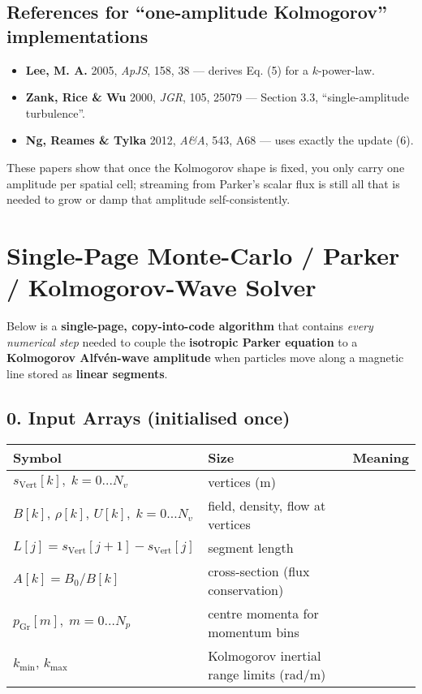 \subsection*{References for “one-amplitude Kolmogorov” implementations}

\begin{itemize}
\item \textbf{Lee, M. A.} 2005, \emph{ApJS}, 158, 38 — derives Eq. (5) for a $k$-power-law.
\item \textbf{Zank, Rice \& Wu} 2000, \emph{JGR}, 105, 25079 — Section 3.3, “single-amplitude turbulence”.
\item \textbf{Ng, Reames \& Tylka} 2012, \emph{A\&A}, 543, A68 — uses exactly the update (6).
\end{itemize}

These papers show that once the Kolmogorov shape is fixed, you only carry one amplitude per spatial cell; streaming from Parker’s scalar flux is still all that is needed to grow or damp that amplitude self-consistently.

\section*{Single-Page Monte-Carlo / Parker / Kolmogorov-Wave Solver}

Below is a \textbf{single-page, copy-into-code algorithm} that contains \emph{every numerical step} needed to couple the \textbf{isotropic Parker equation} to a \textbf{Kolmogorov Alfvén-wave amplitude} when particles move along a magnetic line stored as \textbf{linear segments}.

\subsection*{0. Input Arrays (initialised once)}

\begin{tabular}{|l|l|l|}
\hline
\textbf{Symbol} & \textbf{Size} & \textbf{Meaning} \\
\hline
$s_{\text{Vert}}[k],\; k=0\ldots N_v$ & vertices (m) & \\
$B[k],\, \rho[k],\, U[k],\; k=0\ldots N_v$ & field, density, flow at vertices & \\
$L[j] = s_{\text{Vert}}[j+1] - s_{\text{Vert}}[j]$ & segment length & \\
$A[k] = B_0/B[k]$ & cross-section (flux conservation) & \\
$p_{\text{Gr}}[m],\; m=0\ldots N_p$ & centre momenta for momentum bins & \\
$k_{\min},\,k_{\max}$ & Kolmogorov inertial range limits (rad/m) & \\
\hline
\end{tabular}

